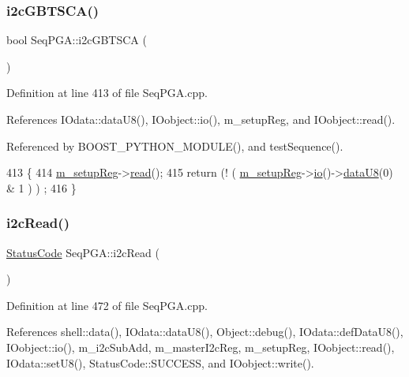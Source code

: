\subsubsection{\texorpdfstring{i2c\+G\+B\+T\+S\+C\+A()}{i2cGBTSCA()}}
{\footnotesize\ttfamily bool Seq\+P\+G\+A\+::i2c\+G\+B\+T\+S\+CA (\begin{DoxyParamCaption}{ }\end{DoxyParamCaption})}



Definition at line 413 of file Seq\+P\+G\+A.\+cpp.



References I\+Odata\+::data\+U8(), I\+Oobject\+::io(), m\+\_\+setup\+Reg, and I\+Oobject\+::read().



Referenced by B\+O\+O\+S\+T\+\_\+\+P\+Y\+T\+H\+O\+N\+\_\+\+M\+O\+D\+U\+L\+E(), and test\+Sequence().


\begin{DoxyCode}
413                        \{
414   \hyperlink{classSeqPGA_a03269241e7fc26493cd0595beda334c2}{m\_setupReg}->\hyperlink{classIOobject_aa07610c11963b1db6710e3c76ceea456}{read}();
415   \textcolor{keywordflow}{return} (! ( \hyperlink{classSeqPGA_a03269241e7fc26493cd0595beda334c2}{m\_setupReg}->\hyperlink{classIOobject_af04fb94137c3d86849f478ac5afab5d1}{io}()->\hyperlink{classIOdata_a75e9c318dbac3a39402179070943d4bc}{dataU8}(0) & 1 ) ) ;
416 \}
\end{DoxyCode}
\mbox{\label{classSeqPGA_a7cd344df2be99f3a02b487f80e87b27e}} 
\subsubsection{\texorpdfstring{i2c\+Read()}{i2cRead()}\hspace{0.1cm}{\footnotesize\ttfamily [1/2]}}
{\footnotesize\ttfamily \hyperlink{classStatusCode}{Status\+Code} Seq\+P\+G\+A\+::i2c\+Read (\begin{DoxyParamCaption}{ }\end{DoxyParamCaption})}



Definition at line 472 of file Seq\+P\+G\+A.\+cpp.



References shell\+::data(), I\+Odata\+::data\+U8(), Object\+::debug(), I\+Odata\+::def\+Data\+U8(), I\+Oobject\+::io(), m\+\_\+i2c\+Sub\+Add, m\+\_\+master\+I2c\+Reg, m\+\_\+setup\+Reg, I\+Oobject\+::read(), I\+Odata\+::set\+U8(), Status\+Code\+::\+S\+U\+C\+C\+E\+SS, and I\+Oobject\+::write().



